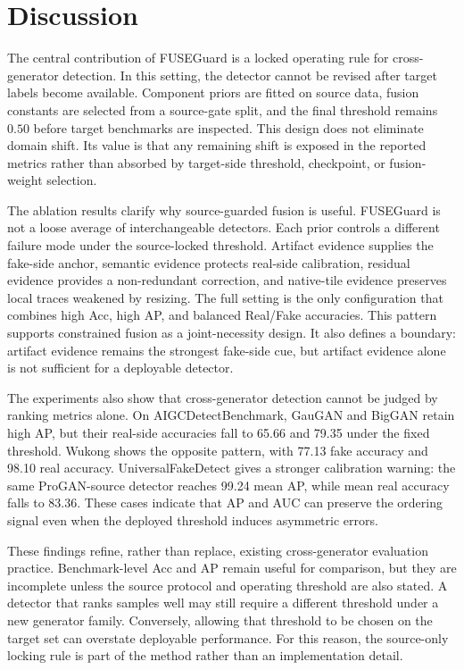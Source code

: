 \documentclass[lettersize,journal]{IEEEtran}
\begin{document}
\section{Discussion}
\label{sec:discussion}

The central contribution of FUSEGuard is a locked operating rule for cross-generator detection. In this setting, the detector cannot be revised after target labels become available. Component priors are fitted on source data, fusion constants are selected from a source-gate split, and the final threshold remains $0.50$ before target benchmarks are inspected. This design does not eliminate domain shift. Its value is that any remaining shift is exposed in the reported metrics rather than absorbed by target-side threshold, checkpoint, or fusion-weight selection.

The ablation results clarify why source-guarded fusion is useful. FUSEGuard is not a loose average of interchangeable detectors. Each prior controls a different failure mode under the source-locked threshold. Artifact evidence supplies the fake-side anchor, semantic evidence protects real-side calibration, residual evidence provides a non-redundant correction, and native-tile evidence preserves local traces weakened by resizing. The full setting is the only configuration that combines high Acc, high AP, and balanced Real/Fake accuracies. This pattern supports constrained fusion as a joint-necessity design. It also defines a boundary: artifact evidence remains the strongest fake-side cue, but artifact evidence alone is not sufficient for a deployable detector.

The experiments also show that cross-generator detection cannot be judged by ranking metrics alone. On AIGCDetectBenchmark, GauGAN and BigGAN retain high AP, but their real-side accuracies fall to 65.66 and 79.35 under the fixed threshold. Wukong shows the opposite pattern, with 77.13 fake accuracy and 98.10 real accuracy. UniversalFakeDetect gives a stronger calibration warning: the same ProGAN-source detector reaches 99.24 mean AP, while mean real accuracy falls to 83.36. These cases indicate that AP and AUC can preserve the ordering signal even when the deployed threshold induces asymmetric errors.

These findings refine, rather than replace, existing cross-generator evaluation practice. Benchmark-level Acc and AP remain useful for comparison, but they are incomplete unless the source protocol and operating threshold are also stated. A detector that ranks samples well may still require a different threshold under a new generator family. Conversely, allowing that threshold to be chosen on the target set can overstate deployable performance. For this reason, the source-only locking rule is part of the method rather than an implementation detail.
\end{document}
